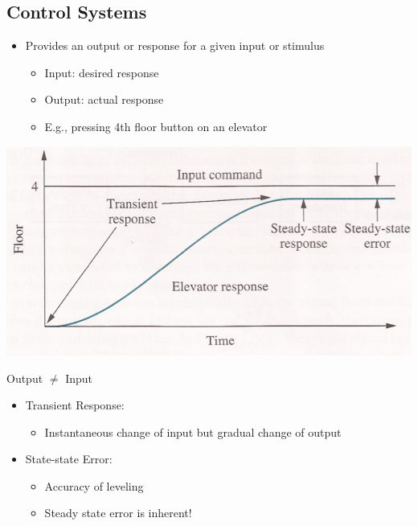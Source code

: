 \documentclass[10pt]{article}
\begin{document}
\subsection*{Control Systems}
\begin{itemize}
	\item Provides an output or response for a given input or stimulus
	\begin{itemize}
        \item Input: desired response
        \item Output: actual response
        \item E.g., pressing 4th floor button on an elevator
    \end{itemize}
\end{itemize}
\begin{center} 
	\includegraphics*[width=\textwidth]{L2_2.png} 
\end{center}
Output $\neq$ Input
\begin{itemize}
	\item Transient Response:
	\begin{itemize}
        \item Instantaneous change of input but gradual change of output
    \end{itemize}
	\item State-state Error:
	\begin{itemize}
        \item Accuracy of leveling
        \item Steady state error is inherent!
    \end{itemize}
\end{itemize}
\end{document}
